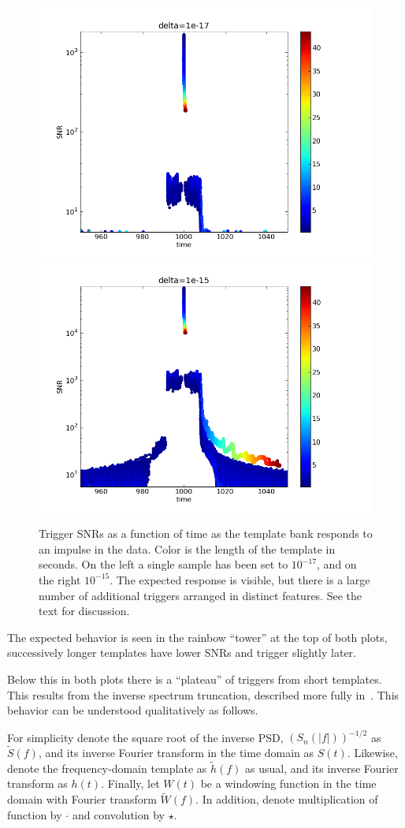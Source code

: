 \begin{figure}
  \includegraphics[width=0.5\linewidth]{figures/detchar/raw1_1e-17}
  \includegraphics[width=0.5\linewidth]{figures/detchar/raw1_1e-15}
  \caption[Response of the template bank to an impulse] {
  \label{f:impulses_original_no_chisq}
Trigger SNRs as a function of time as the template bank responds to an
impulse in the data.  Color is the length of the template in seconds.
On the left a single sample has been set to $10^{-17}$, and on the
right $10^{-15}$.  The expected response is visible, but there is a
large number of additional triggers arranged in distinct features.
See the text for discussion.
}
\end{figure}%

The expected behavior is seen in the rainbow ``tower'' at the top of
both plots, successively longer templates have lower SNRs and trigger
slightly later.

Below this in both plots there is a ``plateau'' of triggers from short
templates.  This results from the inverse spectrum truncation,
described more fully in~\cite{findchirp}.  This behavior can be
understood qualitatively as follows.

For simplicity denote the square root of the inverse PSD,
$(S_n(|f|))^{-1/2}$ as $\tilde{S}(f)$, and its inverse Fourier
transform in the time domain as $S(t)$.  Likewise, denote the
frequency-domain template as $\tilde{h}(f)$ as usual, and its inverse
Fourier transform as $h(t)$.  Finally, let $W(t)$ be a windowing
function in the time domain with Fourier transform $\tilde{W}(f)$.  In
addition, denote multiplication of function by $\cdot$ and convolution
by $\star$.

